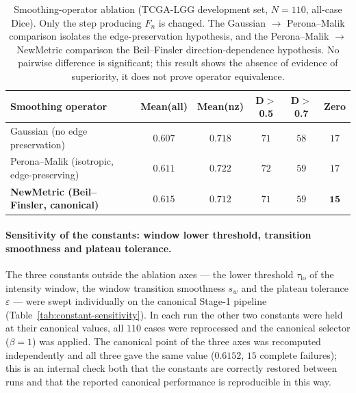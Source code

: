 \documentclass[11pt,a4paper]{article}
\begin{document}
\begin{table}[htpb!]\centering
\caption{Smoothing-operator ablation (TCGA-LGG development set, $N{=}110$, all-case
Dice). Only the step producing $F_n$ is changed. The Gaussian $\to$ Perona--Malik
comparison isolates the edge-preservation hypothesis, and the Perona--Malik $\to$
NewMetric comparison the Beil--Finsler direction-dependence hypothesis. No pairwise
difference is significant; this result shows the absence of evidence of
superiority, it does not prove operator equivalence.}
\label{tab:smoothing}
\begin{tabular}{lccccc}
\toprule
Smoothing operator & Mean(all) & Mean(nz) & D$>$0.5 & D$>$0.7 & Zero \\
\midrule
Gaussian (no edge preservation)          & $0.607$ & $0.718$ & $71$ & $58$ & $17$ \\
Perona--Malik (isotropic, edge-preserving) & $0.611$ & $0.722$ & $72$ & $59$ & $17$ \\
\textbf{NewMetric (Beil--Finsler, canonical)} & $\mathbf{0.615}$ & $0.712$ & $71$ & $59$ & $\mathbf{15}$ \\
\bottomrule
\end{tabular}
\end{table}


\paragraph{Sensitivity of the constants: window lower threshold, transition
smoothness and plateau tolerance.} The three constants outside the ablation axes
--- the lower threshold $\tau_{\text{lo}}$ of the intensity window, the window
transition smoothness $s_w$ and the plateau tolerance $\varepsilon$ --- were swept
individually on the canonical Stage-1 pipeline
(Table~\ref{tab:constant-sensitivity}). In each run the other two constants were
held at their canonical values, all $110$ cases were reprocessed and the canonical
selector ($\beta{=}1$) was applied. The canonical point of the three axes was
recomputed independently and all three gave the same value ($0.6152$, $15$ complete
failures); this is an internal check both that the constants are correctly restored
between runs and that the reported canonical performance is reproducible in this
way.
\end{document}
